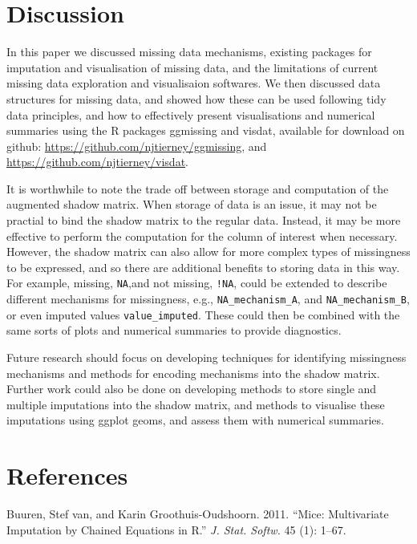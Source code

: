 \documentclass[]{article}
\begin{document}
\section{Discussion}\label{discussion}

In this paper we discussed missing data mechanisms, existing packages
for imputation and visualisation of missing data, and the limitations of
current missing data exploration and visualisaion softwares. We then
discussed data structures for missing data, and showed how these can be
used following tidy data principles, and how to effectively present
visualisations and numerical summaries using the R packages ggmissing
and visdat, available for download on github:
\url{https://github.com/njtierney/ggmissing}, and
\url{https://github.com/njtierney/visdat}.

It is worthwhile to note the trade off between storage and computation
of the augmented shadow matrix. When storage of data is an issue, it may
not be practial to bind the shadow matrix to the regular data. Instead,
it may be more effective to perform the computation for the column of
interest when necessary. However, the shadow matrix can also allow for
more complex types of missingness to be expressed, and so there are
additional benefits to storing data in this way. For example, missing,
\texttt{NA},and not missing, \texttt{!NA}, could be extended to describe
different mechanisms for missingness, e.g., \texttt{NA\_mechanism\_A},
and \texttt{NA\_mechanism\_B}, or even imputed values
\texttt{value\_imputed}. These could then be combined with the same
sorts of plots and numerical summaries to provide diagnostics.

Future research should focus on developing techniques for identifying
missingness mechanisms and methods for encoding mechanisms into the
shadow matrix. Further work could also be done on developing methods to
store single and multiple imputations into the shadow matrix, and
methods to visualise these imputations using ggplot geoms, and assess
them with numerical summaries.

\section*{References}\label{references}

\hypertarget{refs}{}
\hypertarget{ref-mice}{}
Buuren, Stef van, and Karin Groothuis-Oudshoorn. 2011. ``Mice:
Multivariate Imputation by Chained Equations in R.'' \emph{J. Stat.
Softw.} 45 (1): 1--67.
\end{document}
